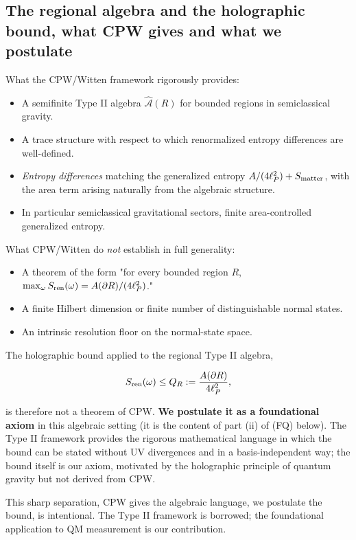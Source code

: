 \documentclass[11pt,a4paper]{article}
\begin{document}
\subsection{The regional algebra and the holographic bound, what CPW gives and what we postulate}

What the CPW/Witten framework rigorously provides:

\begin{itemize}
  \item A semifinite Type II algebra $\hat{\mathcal{A}}(R)$ for bounded regions in semiclassical gravity.
  \item A trace structure with respect to which renormalized entropy differences are well-defined.
  \item \emph{Entropy differences} matching the generalized entropy $A/(4\ell_P^2) + S_{\rm matter}$, with the area term arising naturally from the algebraic structure.
  \item In particular semiclassical gravitational sectors, finite area-controlled generalized entropy.
\end{itemize}

What CPW/Witten do \emph{not} establish in full generality:

\begin{itemize}
  \item A theorem of the form "for every bounded region $R$, $\max_{\omega} S_{\rm ren}(\omega) = A(\partial R)/(4\ell_P^2)$."
  \item A finite Hilbert dimension or finite number of distinguishable normal states.
  \item An intrinsic resolution floor on the normal-state space.
\end{itemize}

The holographic bound applied to the regional Type II algebra,

\[
S_{\rm ren}(\omega) \le Q_R := \frac{A(\partial R)}{4 \ell_P^2},
\]

is therefore not a theorem of CPW. \textbf{We postulate it as a foundational axiom} in this algebraic setting (it is the content of part (ii) of (FQ) below). The Type II framework provides the rigorous mathematical language in which the bound can be stated without UV divergences and in a basis-independent way; the bound itself is our axiom, motivated by the holographic principle of quantum gravity but not derived from CPW.

This sharp separation, CPW gives the algebraic language, we postulate the bound, is intentional. The Type II framework is borrowed; the foundational application to QM measurement is our contribution.
\end{document}
